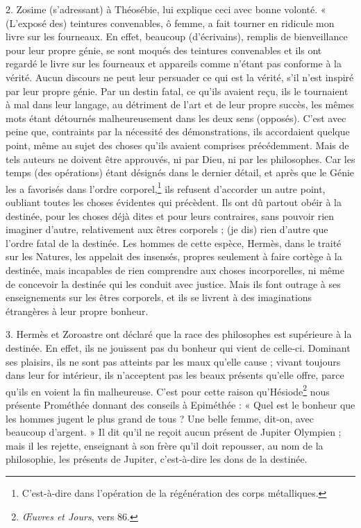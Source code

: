 \documentclass[landscape, a4paper, 11pt, oneside, polutonikogreek, french]{article}
\begin{document}
2. Zosime (s'adressant) à Théosébie, lui explique ceci avec bonne volonté. « (L'exposé des) teintures convenables, ô femme, a fait tourner en ridicule mon livre sur les fourneaux. En effet, beaucoup (d'écrivains), remplis de bienveillance pour leur propre génie, se sont moqués des teintures convenables et ils ont regardé le livre sur les fourneaux et appareils comme n'étant pas conforme à la vérité. Aucun discours ne peut leur persuader ce qui est la vérité, s'il n'est inspiré par leur propre génie. Par un destin fatal, ce qu'ils avaient reçu, ils le tournaient à mal dans leur langage, au détriment de l'art et de leur propre succès, les mêmes mots étant détournés malheureusement dans les deux sens (opposés). C'est avec peine que, contraints par la nécessité des démonstrations, ils accordaient quelque point, même au sujet des choses qu'ils avaient comprises précédemment. Mais de tels auteurs ne doivent être approuvés, ni par Dieu, ni par les philosophes. Car les temps (des opérations) étant désignés dans le dernier détail, et après que le Génie les a favorisés dans l'ordre corporel,\footnote{C'est-à-dire dans l'opération de la régénération des corps métalliques.} ils refusent d'accorder un autre point, oubliant toutes les choses évidentes qui précèdent. Ils ont dû partout obéir à la destinée, pour les choses déjà dites et pour leurs contraires, sans pouvoir rien imaginer d'autre, relativement aux êtres corporels ; (je dis) rien d'autre que l'ordre fatal de la destinée. Les hommes de cette espèce, Hermès, dans le traité sur les Natures, les appelait des insensés, propres seulement à faire cortège à la destinée, mais incapables de rien comprendre aux choses incorporelles, ni même de concevoir la destinée qui les conduit avec justice. Mais ils font outrage à ses enseignements sur les êtres corporels, et ils se livrent à des imaginations étrangères à leur propre bonheur.

3. Hermès et Zoroastre ont déclaré que la race des philosophes est supérieure à la destinée. En effet, ils ne jouissent pas du bonheur qui vient de celle-ci. Dominant ses plaisirs, ils ne sont pas atteints par les maux qu'elle cause ; vivant toujours dans leur for intérieur, ils n'acceptent pas les beaux présents qu'elle offre, parce qu'ils en voient la fin malheureuse. C'est pour cette raison qu'Hésiode\footnote{\emph{Œuvres et Jours}, vers 86.} nous présente Prométhée donnant des conseils à Epiméthée : « Quel est le bonheur que les hommes jugent le plus grand de tous ? Une belle femme, dit-on, avec beaucoup d'argent. » Il dit qu'il ne reçoit aucun présent de Jupiter Olympien ; mais il les rejette, enseignant à son frère qu'il doit repousser, au nom de la philosophie, les présents de Jupiter, c'est-à-dire les dons de la destinée.
\end{document}
